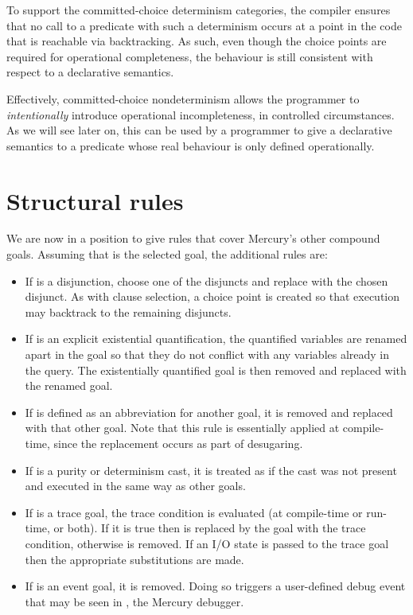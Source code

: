 To support the committed-choice determinism categories,
the compiler ensures that
no call to a predicate with such a determinism
occurs at a point in the code that is reachable via backtracking.
As such,
even though the choice points are required
for operational completeness,
the behaviour is still consistent
with respect to a declarative semantics.

Effectively,
committed-choice nondeterminism allows the programmer
to \emph{intentionally} introduce operational incompleteness,
in controlled circumstances.
As we will see later on,
this can be used by a programmer
to give a declarative semantics to a predicate
whose real behaviour is only defined operationally.


\section{Structural rules}
\label{sec:structure}

We are now in a position to give rules
that cover Mercury's other compound goals.
Assuming that  is the selected goal,
the additional rules are:

\begin{itemize}
\item
If  is a disjunction,
choose one of the disjuncts
and replace  with the chosen disjunct.
As with clause selection,
a choice point is created so that
execution may backtrack to the remaining disjuncts.
\item
If  is an explicit existential quantification,
the quantified variables are renamed apart in the goal
so that they do not conflict with any variables already in the query.
The existentially quantified goal is then removed
and replaced with the renamed goal.
\item
If  is defined as an abbreviation for another goal,
it is removed and replaced with that other goal.
Note that this rule is essentially applied at compile-time,
since the replacement occurs as part of desugaring.
\item
If  is a purity or determinism cast,
it is treated as if the cast was not present
and executed in the same way as other goals.
\item
If  is a trace goal,
the trace condition is evaluated
(at compile-time or run-time, or both).
If it is true then  is replaced
by the goal with the trace condition,
otherwise  is removed.
If an I/O state is passed to the trace goal
then the appropriate substitutions are made.
\item
If  is an event goal,
it is removed.
Doing so triggers a user-defined debug event
that may be seen in ,
the Mercury debugger.
\end{itemize}


